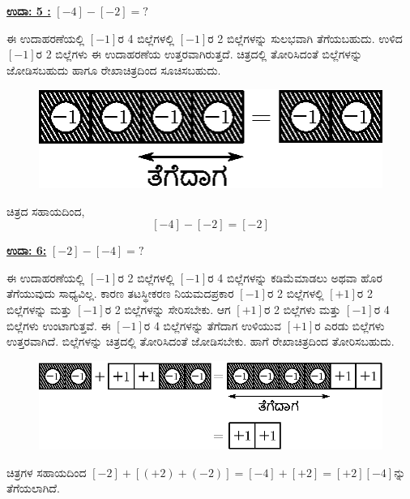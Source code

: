 \noindent
{\textbf{\underline{ಉದಾ: 5 :}}} $[-4] - [-2] = ?$

ಈ ಉದಾಹರಣೆಯಲ್ಲಿ $[-1]$ರ 4 ಬಿಲ್ಲೆಗಳಲ್ಲಿ $[-1]$ರ 2 ಬಿಲ್ಲೆಗಳನ್ನು ಸುಲಭವಾಗಿ ತೆಗೆಯ\-ಬಹುದು. ಉಳಿದ $[-1]$ರ 2 ಬಿಲ್ಲೆಗಳು ಈ ಉದಾಹರಣೆಯ ಉತ್ತರವಾಗಿರುತ್ತದೆ. ಚಿತ್ರದಲ್ಲಿ ತೋರಿಸಿದಂತೆ ಬಿಲ್ಲೆಗಳನ್ನು ಜೋಡಿಸಬಹುದು ಹಾಗೂ ರೇಖಾಚಿತ್ರದಿಂದ ಸೂಚಿಸಬಹುದು. 
\begin{figure}[H]
\centering
\includegraphics[scale=0.8]{src/figure/chap3/fig3-16b.eps}
\end{figure}

ಚಿತ್ರದ ಸಹಾಯದಿಂದ, 
~
\vskip -0.5cm
$$
[-4] - [-2] = [-2]
$$


\noindent
{\textbf{\underline{ಉದಾ: 6:}}} $[-2] - [-4] = ?$

ಈ ಉದಾಹರಣೆಯಲ್ಲಿ $[-1]$ರ 2 ಬಿಲ್ಲೆಗಳಲ್ಲಿ $[-1]$ರ 4 ಬಿಲ್ಲೆಗಳನ್ನು ಕಡಿಮೆ\break ಮಾಡಲು ಅಥವಾ ಹೊರ ತೆಗೆಯುವುದು ಸಾಧ್ಯವಿಲ್ಲ. ಕಾರಣ ತಟಸ್ಥೀಕರಣ ನಿಯಮದ\break  ಪ್ರಕಾರ $[-1]$ರ 2 ಬಿಲ್ಲೆಗಳಲ್ಲಿ $[+1]$ರ 2 ಬಿಲ್ಲೆಗಳನ್ನು ಮತ್ತು $[-1]$ರ 2 ಬಿಲ್ಲೆಗಳನ್ನು ಸೇರಿಸ\break ಬೇಕು. ಆಗ $[+1]$ರ 2 ಬಿಲ್ಲೆಗಳು ಮತ್ತು $[-1]$ರ 4 ಬಿಲ್ಲೆಗಳು ಉಂಟಾಗುತ್ತವೆ. ಈ $[-1]$ರ 4 ಬಿಲ್ಲೆಗಳನ್ನು ತೆಗೆದಾಗ ಉಳಿಯುವ $[+1]$ರ ಎರಡು ಬಿಲ್ಲೆಗಳು ಉತ್ತರವಾಗಿದೆ. ಬಿಲ್ಲೆಗಳನ್ನು ಚಿತ್ರದಲ್ಲಿ ತೋರಿಸಿದಂತೆ ಜೋಡಿಸಬೇಕು. ಹಾಗೆ ರೇಖಾಚಿತ್ರದಿಂದ ತೋರಿಸಬಹುದು. 
\begin{figure}[H]
\centering
\includegraphics[scale=0.8]{src/figure/chap3/fig3-17b.eps}
\end{figure}

ಚಿತ್ರಗಳ ಸಹಾಯದಿಂದ $[-2] + [(+2) + (-2)] = [-4] + [+2] = [+2]$\quad $[-4]$ನ್ನು ತೆಗೆಯಲಾಗಿದೆ.

